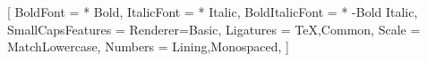 \setsansfont{Libertinus Sans}
		[
			BoldFont          = {* Bold},
  			ItalicFont        = {* Italic},
  			BoldItalicFont    = {* -Bold Italic},
			SmallCapsFeatures = {Renderer=Basic},
			Ligatures         = {TeX,Common},
			Scale             = MatchLowercase,
			Numbers           = {Lining,Monospaced},
		]